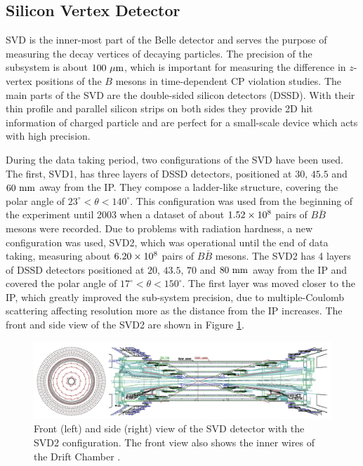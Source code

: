
\subsection{Silicon Vertex Detector}
SVD is the inner-most part of the Belle detector and serves the purpose of measuring the decay vertices of decaying particles. The precision of the subsystem is about $100\mathrm{~\mu m}$, which is important for measuring the difference in $z$-vertex positions of the $B$ mesons in time-dependent CP violation studies. The main parts of the SVD are the double-sided silicon detectors (DSSD). With their thin profile and parallel silicon strips on both sides they provide 2D hit information of charged particle and are perfect for a small-scale device which acts with high precision.

During the data taking period, two configurations of the SVD have been used. The first, SVD1, has three layers of DSSD detectors, positioned at $30$, $45.5$ and $60\mathrm{~mm}$ away from the IP. They compose a ladder-like structure, covering the polar angle of $23^\circ < \theta < 140^\circ$. This configuration was used from the beginning of the experiment until 2003 when a dataset of about $1.52\times 10^{8}$ pairs of $B \bar B$ mesons were recorded. Due to problems with radiation hardness, a new configuration was used, SVD2, which was operational until the end of data taking, measuring about $6.20\times 10^{8}$ pairs of $B \bar B$ mesons. The SVD2 has 4 layers of DSSD detectors positioned at $20$, $43.5$, $70$ and $80\mathrm{~mm}$ away from the IP and covered the polar angle of $17^\circ < \theta < 150^\circ$. The first layer was moved closer to the IP, which greatly improved the sub-system precision, due to multiple-Coulomb scattering affecting resolution more as the distance from the IP increases. The front and side view of the SVD2 are shown in Figure \ref{fig:SVD_layout}.

\begin{figure}[!htb]
	\centering
	\captionsetup{width=0.8\linewidth}
	\includegraphics[width=\linewidth]{fig/setup/SVD_layout}
	\caption{Front (left) and side (right) view of the SVD detector with the SVD2 configuration. The front view also shows the inner wires of the
		Drift Chamber \cite{haba2004letter}.}
	\label{fig:SVD_layout}
\end{figure}

